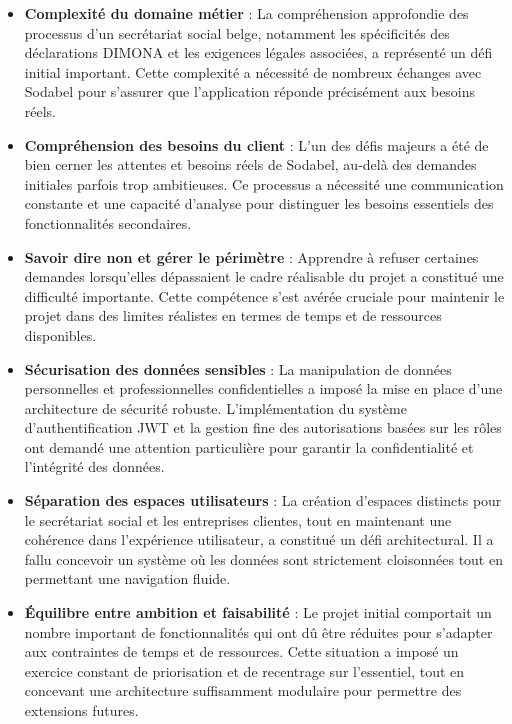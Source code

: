 \begin{itemize}
  \item \textbf{Complexité du domaine métier} : La compréhension approfondie des processus d'un secrétariat social belge, notamment les spécificités des déclarations DIMONA et les exigences légales associées, a représenté un défi initial important. Cette complexité a nécessité de nombreux échanges avec Sodabel pour s'assurer que l'application réponde précisément aux besoins réels.

  \item \textbf{Compréhension des besoins du client} : L'un des défis majeurs a été de bien cerner les attentes et besoins réels de Sodabel, au-delà des demandes initiales parfois trop ambitieuses. Ce processus a nécessité une communication constante et une capacité d'analyse pour distinguer les besoins essentiels des fonctionnalités secondaires.

  \item \textbf{Savoir dire non et gérer le périmètre} : Apprendre à refuser certaines demandes lorsqu'elles dépassaient le cadre réalisable du projet a constitué une difficulté importante. Cette compétence s'est avérée cruciale pour maintenir le projet dans des limites réalistes en termes de temps et de ressources disponibles.

  \item \textbf{Sécurisation des données sensibles} : La manipulation de données personnelles et professionnelles confidentielles a imposé la mise en place d'une architecture de sécurité robuste. L'implémentation du système d'authentification JWT et la gestion fine des autorisations basées sur les rôles ont demandé une attention particulière pour garantir la confidentialité et l'intégrité des données.

  \item \textbf{Séparation des espaces utilisateurs} : La création d'espaces distincts pour le secrétariat social et les entreprises clientes, tout en maintenant une cohérence dans l'expérience utilisateur, a constitué un défi architectural. Il a fallu concevoir un système où les données sont strictement cloisonnées tout en permettant une navigation fluide.

  \item \textbf{Équilibre entre ambition et faisabilité} : Le projet initial comportait un nombre important de fonctionnalités qui ont dû être réduites pour s'adapter aux contraintes de temps et de ressources. Cette situation a imposé un exercice constant de priorisation et de recentrage sur l'essentiel, tout en concevant une architecture suffisamment modulaire pour permettre des extensions futures.
\end{itemize}

